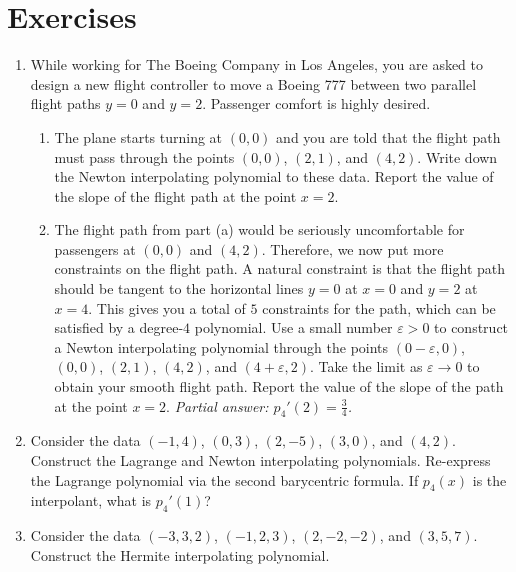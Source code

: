 \documentclass[11pt,letterpaper]{article}
\begin{document}
\section*{Exercises}

\begin{enumerate}

\item While working for The Boeing Company in Los Angeles, you are asked to design a new flight controller to move a Boeing 777 between two parallel flight paths $y=0$ and $y=2$. Passenger comfort is highly desired.

\begin{enumerate}

\item The plane starts turning at $(0,0)$ and you are told that the flight path must pass through the points $(0,0)$, $(2,1)$, and $(4,2)$. Write down the Newton interpolating polynomial to these data. Report the value of the slope of the flight path at the point $x = 2$.

\item The flight path from part (a) would be seriously uncomfortable for passengers at $(0, 0)$ and $(4, 2)$. Therefore, we now put more constraints on the flight path. A natural constraint is that the flight path should be tangent to the horizontal lines $y = 0$ at $x = 0$ and $y = 2$ at $x = 4$. This gives you a total of $5$ constraints for the path, which can be satisfied by a degree-$4$ polynomial. Use a small number $\varepsilon>0$ to construct a Newton interpolating polynomial through the points $(0-\varepsilon,0)$, $(0,0)$, $(2,1)$, $(4,2)$, and $(4+\varepsilon,2)$. Take the limit as $\varepsilon\to0$ to obtain your smooth flight path. Report the value of the slope of the path at the point $x = 2$. {\em Partial answer: $p_4'(2) = \tfrac{3}{4}$.}

\end{enumerate}

\item Consider the data $(-1,4)$, $(0,3)$, $(2,-5)$, $(3,0)$, and $(4,2)$. Construct the Lagrange and Newton interpolating polynomials. Re-express the Lagrange polynomial via the second barycentric formula. If $p_4(x)$ is the interpolant, what is $p_4'(1)$?

\item Consider the data $(-3,3,2)$, $(-1,2,3)$, $(2,-2,-2)$, and $(3,5,7)$. Construct the Hermite interpolating polynomial.


\end{enumerate}
\end{document}
